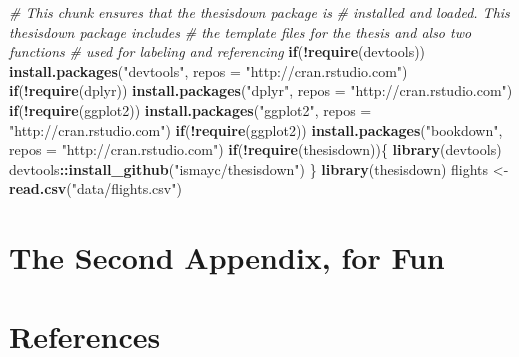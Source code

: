 \documentclass[12pt,twoside]{reedthesis}
\newenvironment{Shaded}{\begin{snugshade}}{\end{snugshade}}
\newcommand{\CommentTok}[1]{\textcolor[rgb]{0.56,0.35,0.01}{\textit{#1}}}
\newcommand{\ControlFlowTok}[1]{\textcolor[rgb]{0.13,0.29,0.53}{\textbf{#1}}}
\newcommand{\DataTypeTok}[1]{\textcolor[rgb]{0.13,0.29,0.53}{#1}}
\newcommand{\KeywordTok}[1]{\textcolor[rgb]{0.13,0.29,0.53}{\textbf{#1}}}
\newcommand{\NormalTok}[1]{#1}
\newcommand{\OperatorTok}[1]{\textcolor[rgb]{0.81,0.36,0.00}{\textbf{#1}}}
\newcommand{\StringTok}[1]{\textcolor[rgb]{0.31,0.60,0.02}{#1}}
\theoremstyle{definition}
\theoremstyle{definition}
\theoremstyle{definition}
\theoremstyle{remark}
\begin{document}
\begin{Shaded}
\begin{Highlighting}[]
\CommentTok{# This chunk ensures that the thesisdown package is}
\CommentTok{# installed and loaded. This thesisdown package includes}
\CommentTok{# the template files for the thesis and also two functions}
\CommentTok{# used for labeling and referencing}
\ControlFlowTok{if}\NormalTok{(}\OperatorTok{!}\KeywordTok{require}\NormalTok{(devtools))}
  \KeywordTok{install.packages}\NormalTok{(}\StringTok{"devtools"}\NormalTok{, }\DataTypeTok{repos =} \StringTok{"http://cran.rstudio.com"}\NormalTok{)}
\ControlFlowTok{if}\NormalTok{(}\OperatorTok{!}\KeywordTok{require}\NormalTok{(dplyr))}
    \KeywordTok{install.packages}\NormalTok{(}\StringTok{"dplyr"}\NormalTok{, }\DataTypeTok{repos =} \StringTok{"http://cran.rstudio.com"}\NormalTok{)}
\ControlFlowTok{if}\NormalTok{(}\OperatorTok{!}\KeywordTok{require}\NormalTok{(ggplot2))}
    \KeywordTok{install.packages}\NormalTok{(}\StringTok{"ggplot2"}\NormalTok{, }\DataTypeTok{repos =} \StringTok{"http://cran.rstudio.com"}\NormalTok{)}
\ControlFlowTok{if}\NormalTok{(}\OperatorTok{!}\KeywordTok{require}\NormalTok{(ggplot2))}
    \KeywordTok{install.packages}\NormalTok{(}\StringTok{"bookdown"}\NormalTok{, }\DataTypeTok{repos =} \StringTok{"http://cran.rstudio.com"}\NormalTok{)}
\ControlFlowTok{if}\NormalTok{(}\OperatorTok{!}\KeywordTok{require}\NormalTok{(thesisdown))\{}
  \KeywordTok{library}\NormalTok{(devtools)}
\NormalTok{  devtools}\OperatorTok{::}\KeywordTok{install_github}\NormalTok{(}\StringTok{"ismayc/thesisdown"}\NormalTok{)}
\NormalTok{  \}}
\KeywordTok{library}\NormalTok{(thesisdown)}
\NormalTok{flights <-}\StringTok{ }\KeywordTok{read.csv}\NormalTok{(}\StringTok{"data/flights.csv"}\NormalTok{)}
\end{Highlighting}
\end{Shaded}
\hypertarget{the-second-appendix-for-fun}{%
\chapter{The Second Appendix, for
Fun}\label{the-second-appendix-for-fun}}

\backmatter

\hypertarget{references-1}{%
\chapter*{References}\label{references-1}}


\noindent

\setlength{\parindent}{-0.20in}
\setlength{\leftskip}{0.20in}
\setlength{\parskip}{8pt}


\end{document}
